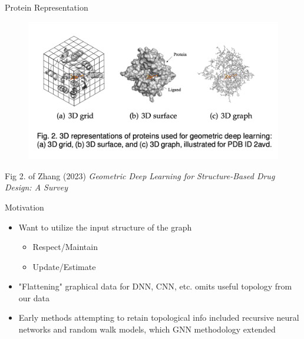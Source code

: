 \documentclass{beamer}
\begin{document}
\begin{frame}{Protein Representation }
    \begin{figure}
        \centering
        \includegraphics[scale=0.45]{Zhang_Protein3D.png}
    \end{figure}
    Fig 2. of Zhang (2023) {\it Geometric Deep Learning for Structure-Based Drug Design: A Survey} \cite{zhang_systematic_2023}
\end{frame}

\begin{frame}{Motivation}
    \begin{itemize}
        \item Want to utilize the input structure of the graph
        \begin{itemize}
            \item Respect/Maintain
            \item Update/Estimate
        \end{itemize} 
        \item "Flattening" graphical data for DNN, CNN, etc. omits useful topology from our data 
        \item Early methods attempting to retain topological info included recursive neural networks and random walk models, which GNN methodology extended \cite{scarselli_graph_2009} 
    \end{itemize}
\end{frame}
\end{document}
